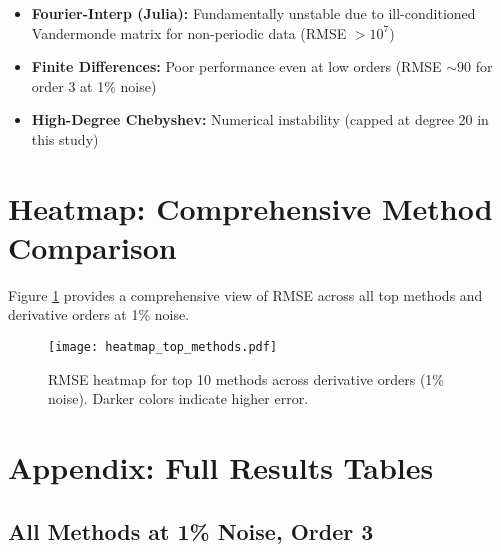 \documentclass[11pt]{article}
\begin{document}
\begin{itemize}
    \item \textbf{Fourier-Interp (Julia):} Fundamentally unstable due to ill-conditioned Vandermonde matrix for non-periodic data (RMSE $> 10^7$)
    \item \textbf{Finite Differences:} Poor performance even at low orders (RMSE $\sim 90$ for order 3 at 1\% noise)
    \item \textbf{High-Degree Chebyshev:} Numerical instability (capped at degree 20 in this study)
\end{itemize}

\section{Heatmap: Comprehensive Method Comparison}

Figure \ref{fig:heatmap} provides a comprehensive view of RMSE across all top methods and derivative orders at 1\% noise.

\begin{figure}[H]
\centering
\texttt{[image: heatmap\_top\_methods.pdf]}
\caption{RMSE heatmap for top 10 methods across derivative orders (1\% noise). Darker colors indicate higher error.}
\label{fig:heatmap}
\end{figure}

\section{Appendix: Full Results Tables}

\subsection{All Methods at 1\% Noise, Order 3}
\end{document}
